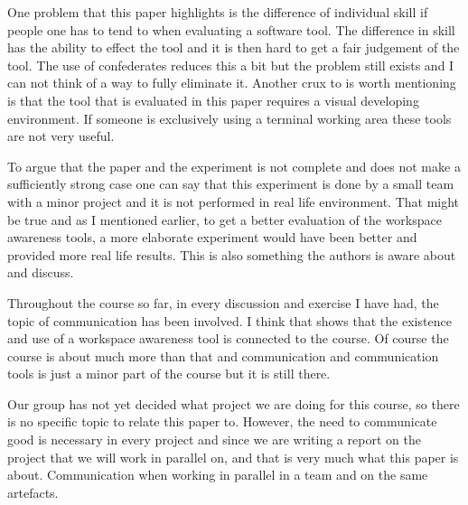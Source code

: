 \documentclass[a4paper]{article}
\begin{document}
One problem that this paper highlights is the difference of individual skill if people one has to tend to when evaluating a software tool. The difference in skill has the ability to effect the tool and it is then hard to get a fair judgement of the tool. The use of confederates reduces this a bit but the problem still exists and I can not think of a way to fully eliminate it. Another crux to is worth mentioning is that the tool that is evaluated in this paper requires a visual developing environment. If someone is exclusively using a terminal working area these tools are not very useful.

To argue that the paper and the experiment is not complete and does not make a sufficiently strong case one can say that this experiment is done by a small team with a minor project and it is not performed in real life environment. That might be true and as I mentioned earlier, to get a better evaluation of the workspace awareness tools, a more elaborate experiment would have been better and provided more real life results. This is also something the authors is aware about and discuss.

Throughout the course so far, in every discussion and exercise I have had, the topic of communication has been involved. I think that shows that the existence and use of a workspace awareness tool is connected to the course. Of course the course is about much more than that and communication and communication tools is just a minor part of the course but it is still there.

Our group has not yet decided what project we are doing for this course, so there is no specific topic to relate this paper to. However, the need to communicate good is necessary in every project and since we are writing a report on the project that we will work in parallel on, and that is very much what this paper is about. Communication when working in parallel in a team and on the same artefacts.
\end{document}
